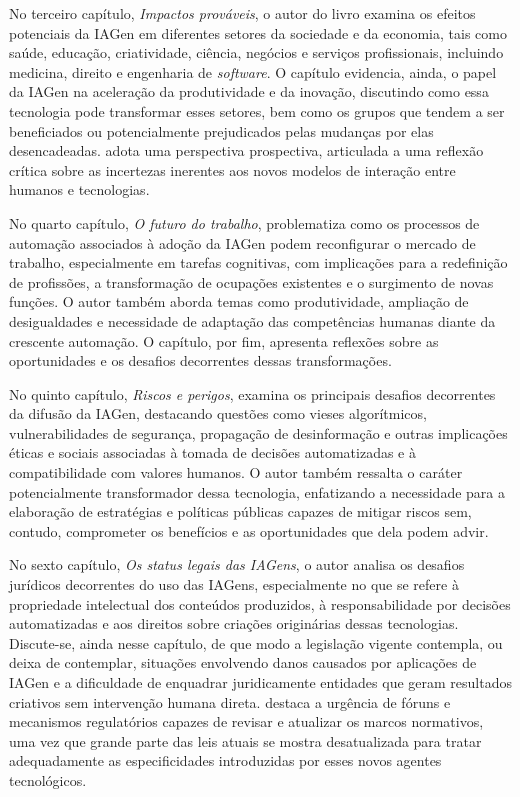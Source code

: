 \documentclass[portuguese]{textolivre}
\begin{document}
No terceiro capítulo, \textit{Impactos prováveis}, o autor do livro examina os efeitos potenciais da IAGen em diferentes setores da sociedade e da economia, tais como saúde, educação, criatividade, ciência, negócios e serviços profissionais, incluindo medicina, direito e engenharia de \textit{software}. O capítulo evidencia, ainda, o papel da IAGen na aceleração da produtividade e da inovação, discutindo como essa tecnologia pode transformar esses setores, bem como os grupos que tendem a ser beneficiados ou potencialmente prejudicados pelas mudanças por elas desencadeadas. \textcite{kaplan2024generative} adota uma perspectiva prospectiva, articulada a uma reflexão crítica sobre as incertezas inerentes aos novos modelos de interação entre humanos e tecnologias.

No quarto capítulo, \textit{O futuro do trabalho}, \textcite{kaplan2024generative} problematiza como os processos de automação associados à adoção da IAGen podem reconfigurar o mercado de trabalho, especialmente em tarefas cognitivas, com implicações para a redefinição de profissões, a transformação de ocupações existentes e o surgimento de novas funções. O autor também aborda temas como produtividade, ampliação de desigualdades e necessidade de adaptação das competências humanas diante da crescente automação. O capítulo, por fim, apresenta reflexões sobre as oportunidades e os desafios decorrentes dessas transformações.

No quinto capítulo, \textit{Riscos e perigos}, \textcite{kaplan2024generative} examina os principais desafios decorrentes da difusão da IAGen, destacando questões como vieses algorítmicos, vulnerabilidades de segurança, propagação de desinformação e outras implicações éticas e sociais associadas à tomada de decisões automatizadas e à compatibilidade com valores humanos. O autor também ressalta o caráter potencialmente transformador dessa tecnologia, enfatizando a necessidade para a elaboração de estratégias e políticas públicas capazes de mitigar riscos sem, contudo, comprometer os benefícios e as oportunidades que dela podem advir.

No sexto capítulo, \textit{Os status legais das IAGens}, o autor analisa os desafios jurídicos decorrentes do uso das IAGens, especialmente no que se refere à propriedade intelectual dos conteúdos produzidos, à responsabilidade por decisões automatizadas e aos direitos sobre criações originárias dessas tecnologias. Discute-se, ainda nesse capítulo, de que modo a legislação vigente contempla, ou deixa de contemplar, situações envolvendo danos causados por aplicações de IAGen e a dificuldade de enquadrar juridicamente entidades que geram resultados criativos sem intervenção humana direta. \textcite{kaplan2024generative} destaca a urgência de fóruns e mecanismos regulatórios capazes de revisar e atualizar os marcos normativos, uma vez que grande parte das leis atuais se mostra desatualizada para tratar adequadamente as especificidades introduzidas por esses novos agentes tecnológicos.
\end{document}
